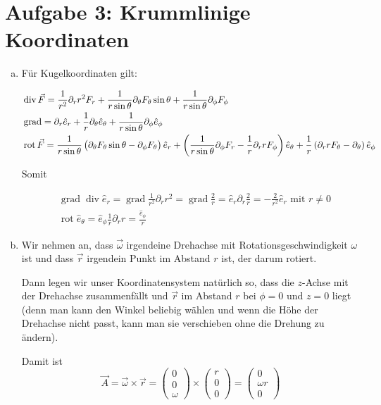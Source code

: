 \documentclass[a4paper,german,12pt,smallheadings]{scrartcl}
\begin{document}
\section*{Aufgabe 3: Krummlinige Koordinaten}
\begin{enumerate}[a)]
  \item
    Für Kugelkoordinaten gilt:

    \begin{align}
      &\operatorname{div} \vec{F} = \frac{1}{r^2} \partial_r r^2 F_r + \frac{1}{r \sin \theta} \partial_\theta F_\theta \sin \theta + \frac{1}{r \sin \theta} \partial_\phi F_\phi \\
      &\operatorname{grad} = \partial_r \hat{e}_r + \frac{1}{r} \partial_\theta \hat{e}_\theta + \frac{1}{r \sin \theta} \partial_\phi \hat{e}_\phi \\
      &\operatorname{rot} \vec{F} =
      \frac{1}{r \sin \theta} \del{\partial_\theta F_\theta \sin \theta - \partial_\phi F_\theta} \hat{e}_r +
      \del{\frac{1}{r \sin \theta} \partial_\phi F_r - \frac{1}{r} \partial_r r F_\phi} \hat{e}_\theta +
      \frac{1}{r} \del{\partial_r r F_\theta - \partial_\theta} \hat{e}_\phi
    \end{align}

    Somit

    \begin{align}
      &\operatorname{grad} \operatorname{div} \hat{e}_r
      = \operatorname{grad} \frac{1}{r^2} \partial_r r^2
      = \operatorname{grad} \frac{2}{r}
      = \hat{e}_r \partial_r \frac{2}{r}
      = -\frac{2}{r^2} \hat{e}_r \text{ mit } r \neq 0 \\
      &\operatorname{rot} \hat{e}_\theta
      = \hat{e}_\phi \frac{1}{r} \partial_r r
      = \frac{\hat{e}_\phi}{r}
    \end{align}
  \item
    Wir nehmen an, dass $\vec{\omega}$ irgendeine Drehachse mit
    Rotationsgeschwindigkeit $\omega$ ist und dass $\vec{r}$ irgendein Punkt im
    Abstand $r$ ist, der darum rotiert.

    Dann legen wir unser Koordinatensystem natürlich so, dass die $z$-Achse mit
    der Drehachse zusammenfällt und $\vec{r}$ im Abstand $r$ bei $\phi = 0$ und
    $z=0$ liegt (denn man kann den Winkel beliebig wählen und wenn die Höhe der
    Drehachse nicht passt, kann man sie verschieben ohne die Drehung zu
    ändern).

    Damit ist
    \begin{equation}
      \vec{A}
      = \vec{\omega} \times \vec{r}
      = \begin{pmatrix} 0 \\ 0 \\ \omega \end{pmatrix} \times  \begin{pmatrix} r \\ 0 \\ 0\end{pmatrix}
      = \begin{pmatrix} 0 \\ \omega r\\ 0 \end{pmatrix}
    \end{equation}


\end{enumerate}
\end{document}
